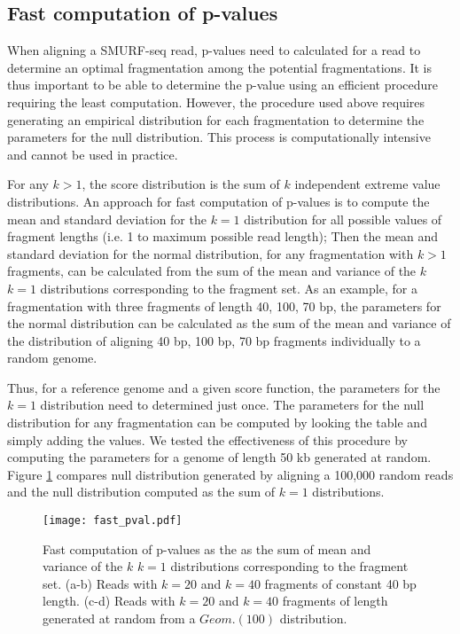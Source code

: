 \subsection{Fast computation of p-values}
\label{fast_pval_comp}
When aligning a SMURF-seq read, p-values need to calculated for a read
to determine an optimal fragmentation among the potential
fragmentations. It is thus important to be able to determine the p-value
using an efficient procedure requiring the least computation.
%
However, the procedure used above requires generating an empirical
distribution for each fragmentation to determine the parameters for the
null distribution. This process is computationally intensive and cannot
be used in practice.

For any $k > 1$, the score distribution is the sum of $k$ independent
extreme value distributions. An approach for fast computation of
p-values is to compute the mean and standard deviation for the $k=1$
distribution for all possible values of fragment lengths (i.e. 1 to
maximum possible read length); Then the mean and standard deviation for
the normal distribution, for any fragmentation with $k > 1$ fragments,
can be calculated from the sum of the mean and variance of the
$k$ $k=1$ distributions corresponding to the fragment set.
%
As an example, for a fragmentation with three fragments of length 40,
100, 70 bp, the parameters for the normal distribution can be calculated
as the sum of the mean and variance of the distribution of aligning 40
bp, 100 bp, 70 bp fragments individually to a random genome.

Thus, for a reference genome and a given score function, the parameters
for the $k=1$ distribution need to determined just once. The parameters
for the null distribution for any fragmentation can be computed by
looking the table and simply adding the values.
%
We tested the effectiveness of this procedure by computing the
parameters for a genome of length 50 kb generated at random. Figure
\ref{fast_pval} compares null distribution generated by aligning a
100,000 random reads and the null distribution
computed as the sum of $k=1$ distributions.


\begin{figure}[t!]
\centering
\texttt{[image: fast\_pval.pdf]}
\caption[Fast computation of p-values]{
  Fast computation of p-values as the as the sum of mean and variance of
  the $k$ $k=1$ distributions corresponding to the fragment set.
  (a-b) Reads with $k=20$ and $k=40$ fragments of constant 40 bp length.
  (c-d) Reads with $k=20$ and $k=40$ fragments of length generated at
  random from a $Geom.(100)$ distribution.}
\label{fast_pval}
\end{figure}


